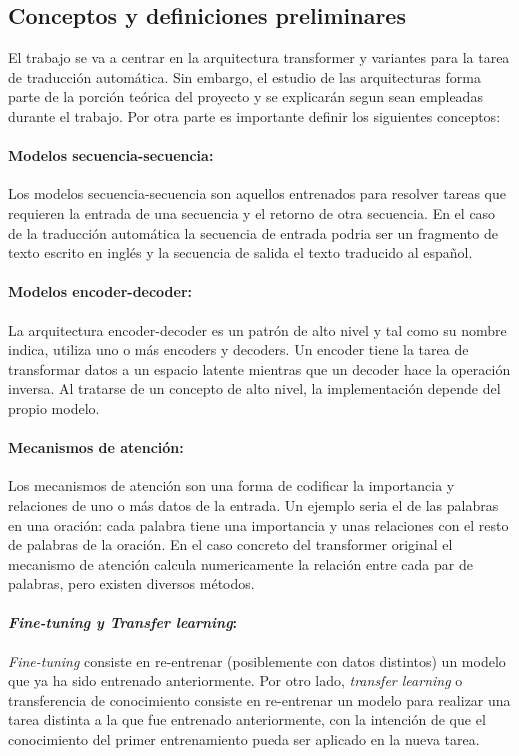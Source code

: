 \subsection{Conceptos y definiciones preliminares}
El trabajo se va a centrar en la arquitectura transformer \cite{Vaswani2017Jun} y variantes 
para la tarea de traducción automática. Sin embargo, el estudio de las arquitecturas
forma parte de la porción teórica del proyecto y se explicarán segun sean empleadas durante el trabajo.
Por otra parte es importante definir los siguientes conceptos:

\paragraph{Modelos secuencia-secuencia:}
Los modelos secuencia-secuencia son aquellos entrenados para
resolver tareas que requieren la entrada de una secuencia y el retorno de
otra secuencia.
En el caso de la traducción automática la secuencia de entrada podria ser
un fragmento de texto escrito en inglés y la secuencia de salida el texto
traducido al español.

\paragraph{Modelos encoder-decoder:}
La arquitectura encoder-decoder es un patrón de alto nivel y tal como su nombre indica,
utiliza uno o más encoders y decoders.
Un encoder tiene la tarea de transformar datos a un espacio latente
mientras que un decoder hace la operación inversa. Al tratarse de un concepto de alto nivel, la
implementación depende del propio modelo.

\paragraph{Mecanismos de atención:}
Los mecanismos de atención son una forma de codificar la importancia y relaciones de uno o más
datos de la entrada. Un ejemplo seria el de las palabras en una oración: cada palabra tiene una
importancia y unas relaciones con el resto de palabras de la oración.
En el caso concreto del transformer original \cite{Vaswani2017Jun} el mecanismo de atención
calcula numericamente la relación entre cada par de palabras, pero existen diversos métodos.

\paragraph{\textit{Fine-tuning y Transfer learning}:}
\textit{Fine-tuning} consiste en re-entrenar (posiblemente con datos distintos) un modelo que ya ha
sido entrenado anteriormente. Por otro lado, \textit{transfer learning} o transferencia de conocimiento
consiste en re-entrenar un modelo para realizar una tarea distinta a la que fue entrenado anteriormente,
con la intención de que el conocimiento del primer entrenamiento pueda ser aplicado en la nueva tarea.

